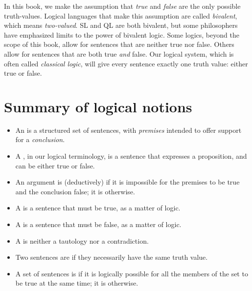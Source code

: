 In this book, we make the assumption that \emph{true} and \emph{false} are the only possible truth-values. Logical languages that make this assumption are called \emph{bivalent}, which means \emph{two-valued}. SL and QL are both bivalent, but some philosophers have emphasized limits to the power of bivalent logic. Some logics, beyond the scope of this book, allow for sentences that are neither true nor false. Others allow for sentences that are both true \emph{and} false. Our logical system, which is often called \emph{classical logic}, will give every sentence exactly one truth value: either true or false.


\section*{Summary of logical notions}
\begin{itemize}

\item An  is a structured set of sentences, with \emph{premises} intended to offer support for a \emph{conclusion}.

\item A , in our logical terminology, is a sentence that expresses a proposition, and can be either true or false.

\item An argument is (deductively)  if it is impossible for the premises to be true and the conclusion false; it is  otherwise.

\item A  is a sentence that must be true, as a matter of logic.

\item A  is a sentence that must be false, as a matter of logic.

\item A  is neither a tautology nor a contradiction.

\item Two sentences are  if they necessarily have the same truth value.

\item A set of sentences is  if it is logically possible for all the members of the set to be true at the same time; it is  otherwise.
\end{itemize}



